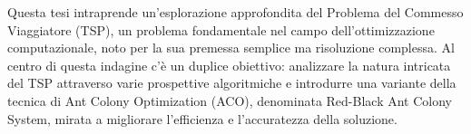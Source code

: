 
%


Questa tesi intraprende un’esplorazione approfondita del Problema del Commesso Viaggiatore (TSP), 
un problema fondamentale nel campo dell’ottimizzazione computazionale, noto
per la sua premessa semplice ma risoluzione complessa. Al centro di questa indagine c’è un
duplice obiettivo: analizzare la natura intricata del TSP attraverso varie prospettive algoritmiche 
e introdurre una variante della tecnica di Ant Colony Optimization (ACO),
denominata Red-Black Ant Colony System, mirata a migliorare l’efficienza e l’accuratezza della soluzione.

